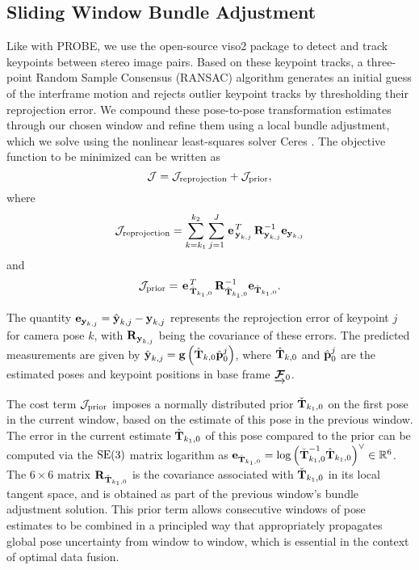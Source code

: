 \subsection{Sliding Window Bundle Adjustment}
Like with PROBE, we use the open-source \textsf{viso2} package \citep{Geiger2011-xe} to detect and track keypoints between stereo image pairs.
Based on these keypoint tracks, a three-point Random Sample Consensus (RANSAC) algorithm \citep{fischler1981random} generates an initial guess of the interframe motion and rejects outlier keypoint tracks by thresholding their reprojection error.
We compound these pose-to-pose transformation estimates through our chosen window and refine them using a local bundle adjustment, which we solve using the nonlinear least-squares solver Ceres \citep{ceres-solver}.
The objective function to be minimized can be written as
\begin{equation} \label{eq:cost_function}
    \mathcal{J} = \mathcal{J}_\text{reprojection} + \mathcal{J}_\text{prior},
\end{equation}
where
\begin{equation} \label{eq:reprojection_cost}
	\mathcal{J}_\text{reprojection} = \sum_{k=k_1}^{k_2} \sum_{j=1}^J \left.{\boldsymbol{\mathbf{e}}}\right.^T_{\boldsymbol{\mathbf{y}}_{k,j}} \boldsymbol{\mathbf{R}}^{-1}_{\boldsymbol{\mathbf{y}}_{k,j}} \boldsymbol{\mathbf{e}}_{\boldsymbol{\mathbf{y}}_{k,j}}
\end{equation}
and 
\begin{equation} \label{eq:prior_cost}
	\mathcal{J}_\text{prior} = \left.{\boldsymbol{\mathbf{e}}}\right.^T_{\hat{\boldsymbol{\mathbf{T}}}_{k_1,0}} \boldsymbol{\mathbf{R}}^{-1}_{\hat{\boldsymbol{\mathbf{T}}}_{k_1,0}} \boldsymbol{\mathbf{e}}_{\hat{\boldsymbol{\mathbf{T}}}_{k_1,0}}.
\end{equation}

The quantity $\boldsymbol{\mathbf{e}}_{\boldsymbol{\mathbf{y}}_{k,j}} = \hat{\boldsymbol{\mathbf{y}}}_{k,j} - \boldsymbol{\mathbf{y}}_{k,j}$ represents the reprojection error of keypoint $j$ for camera pose $k$, with $\boldsymbol{\mathbf{R}}_{\boldsymbol{\mathbf{y}}_{k,j}}$ being the covariance of these errors.
The predicted measurements are given by $\hat{\boldsymbol{\mathbf{y}}}_{k,j} = \boldsymbol{\mathbf{g}}\left(\hat{\boldsymbol{\mathbf{T}}}_{k,0} \hat{\boldsymbol{\mathbf{p}}}^j_{0}\right)$, where $\hat{\boldsymbol{\mathbf{T}}}_{k,0}$ and $\hat{\boldsymbol{\mathbf{p}}}^j_{0}$ are the estimated poses and keypoint positions in base frame $\underrightarrow{ \boldsymbol{\mathbf{\mathcal{F}}} }_{0}$.

The cost term $\mathcal{J}_\text{prior}$ imposes a normally distributed prior $\check{\boldsymbol{\mathbf{T}}}_{k_1,0}$ on the first pose in the current window, based on the estimate of this pose in the previous window.
The error in the current estimate $\hat{\boldsymbol{\mathbf{T}}}_{k_1,0}$ of this pose compared to the prior can be computed via the $\mathrm{SE}(3)$ matrix logarithm as $\boldsymbol{\mathbf{e}}_{\check{\boldsymbol{\mathbf{T}}}_{k_1,0}} = \log \left( \check{\boldsymbol{\mathbf{T}}}_{k_1,0}^{-1} \hat{\boldsymbol{\mathbf{T}}}_{k_1,0} \right)^\vee \in \mathbb{R}^6$.
The $6 \times 6$ matrix $\boldsymbol{\mathbf{R}}_{\check{\boldsymbol{\mathbf{T}}}_{k_1,0}}$ is the covariance associated with $\check{\boldsymbol{\mathbf{T}}}_{k_1,0}$ in its local tangent space, and is obtained as part of the previous window's bundle adjustment solution.
This prior term allows consecutive windows of pose estimates to be combined in a principled way that appropriately propagates global pose uncertainty from window to window, which is essential in the context of optimal data fusion.

